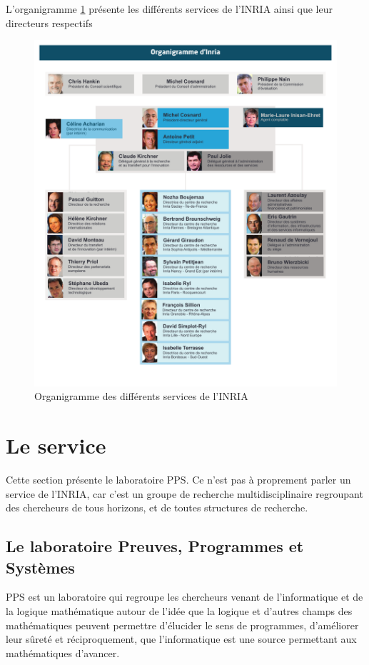 \documentclass[a4paper, 11pt]{report}
\begin{document}
    L'organigramme \cref{orga} présente les différents services de l'INRIA ainsi
    que leur directeurs respectifs
    \begin{figure}
    \includegraphics[scale=0.85]{data/organigrammeinria.pdf}
    \caption{Organigramme des différents services de l'INRIA}
    \label{orga}
    \end{figure}

  \section{Le service}
  Cette section présente le laboratoire PPS. Ce n'est pas à proprement parler
  un service de l'INRIA, car c'est un groupe de recherche multidisciplinaire
  regroupant des chercheurs de tous horizons, et de toutes structures de
  recherche.
    \subsection{Le laboratoire Preuves, Programmes  et Systèmes}
    PPS est un laboratoire qui regroupe les chercheurs venant de l'informatique
    et de la logique mathématique autour de l'idée que la logique et d'autres
    champs des mathématiques peuvent permettre d'élucider le sens de programmes,
    d'améliorer leur sûreté et réciproquement, que l'informatique est une source
    permettant aux mathématiques d'avancer.
\end{document}
